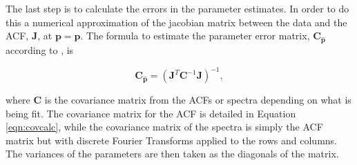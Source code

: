 \documentclass[draft,ras]{agutex}
\begin{document}
\begin{article}

The last step is to calculate the errors in the parameter estimates. In order to do this a numerical approximation of the jacobian matrix between the data and the ACF, $\mathbf{J}$, at $\mathbf{p}=\mathbf{\hat{p}}$. The formula to estimate the parameter error matrix, $\mathbf{C}_{\mathbf{\hat{p}}}$ according to \citet{Hysell:2000cq}, is


\begin{equation}
\label{eqn:jacinv}
\mathbf{C}_{\mathbf{\hat{p}}}=(\mathbf{J}^T \mathbf{C}^{-1}\mathbf{J})^{-1},
\end{equation}

\noindent where $ \mathbf{C}$ is the covariance matrix from the ACFs or spectra depending on what is being fit. The covariance matrix for the ACF is detailed in Equation \ref{eqn:covcalc}, while the covariance matrix of the spectra is simply the ACF matrix but with discrete Fourier Transforms applied to the rows and columns. The variances of the parameters are then taken as the diagonals of the matrix.


%
%




\end{article}
\end{document}
